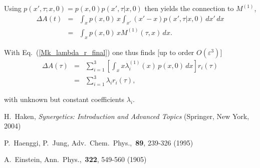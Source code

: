 \documentclass[aps,twocolumn,superscriptaddress,showpacs,showkeys]{revtex4}
\newcommand{\eps}{\varepsilon}
\begin{document}
{\noindent Using $p(x',\tau;x,0)\!=\!p(x,0)p(x',\tau|x,0)$ then yields the connection to $M^{(1)}$,
%
\begin{eqnarray}
\Delta A(t) &=& \int_{x}p(x,0)\,x \int_{x'}  (x'-x)p(x',\tau|x,0)\,dx'\,dx\nonumber\\[.3em]
            &=& \int_{x}p(x,0)\,x M^{(1)}(\tau,x)\,dx.
\end{eqnarray}

\noindent With Eq.~(\ref{Mk_lambda_r_final}) one thus finds [up to order $O(\eps^3)$]
%
\begin{eqnarray}
\Delta A(\tau) &=& \sum_{i=1}^3  \left[\int_{x} x \lambda_i^{(1)}(x)\,p(x,0)\,dx\right]r_i(\tau)\nonumber\\[.3em]
               &=& \sum_{i=1}^3  \lambda_i r_i(\tau),
\end{eqnarray}

\noindent with unknown but constant coefficients $\lambda_i$.

\begin{thebibliography}{00}

        H.~Haken,
                         {\it Synergetics: Introduction and Advanced Topics}
                         (Springer, New York, 2004)



      P.~Haenggi, P.~Jung,
                        Adv.~Chem.~Phys.,~{\bf 89}, 239-326 (1995)


    A.~Einstein,
                        Ann.~Phys.,~{\bf 322}, 549-560 (1905)




\end{thebibliography}}
\end{document}
